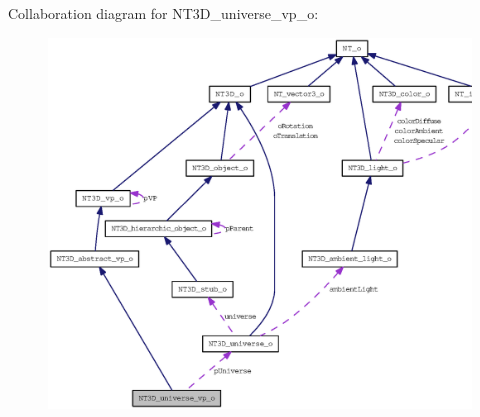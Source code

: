 Collaboration diagram for NT3D\_\-universe\_\-vp\_\-o:
\nopagebreak
\begin{figure}[H]
\begin{center}
\leavevmode
\includegraphics[width=400pt]{class_n_t3_d__universe__vp__o__coll__graph}
\end{center}
\end{figure}
